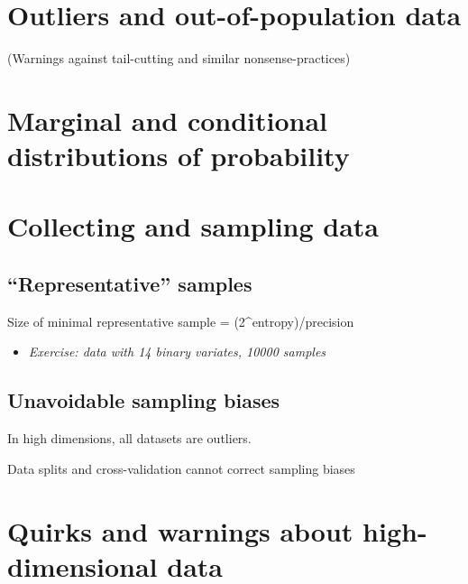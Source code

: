 \documentclass[
  letterpaper,
  DIV=11,
  numbers=noendperiod,
  oneside]{scrreprt}
\providecommand{\tightlist}{%
  \setlength{\itemsep}{0pt}\setlength{\parskip}{0pt}}\usepackage{longtable,booktabs,array}
\begin{document}
\hypertarget{outliers-and-out-of-population-data}{%
\section{Outliers and out-of-population
data}\label{outliers-and-out-of-population-data}}

(Warnings against tail-cutting and similar nonsense-practices)

\hypertarget{marginal-and-conditional-distributions-of-probability}{%
\section{Marginal and conditional distributions of
probability}\label{marginal-and-conditional-distributions-of-probability}}

\hypertarget{collecting-and-sampling-data}{%
\section{Collecting and sampling
data}\label{collecting-and-sampling-data}}

\hypertarget{representative-samples}{%
\subsection{``Representative'' samples}\label{representative-samples}}

Size of minimal representative sample = (2\^{}entropy)/precision

\begin{itemize}
\tightlist
\item
  \emph{Exercise: data with 14 binary variates, 10000 samples}
\end{itemize}

\hypertarget{unavoidable-sampling-biases}{%
\subsection{Unavoidable sampling
biases}\label{unavoidable-sampling-biases}}

In high dimensions, all datasets are outliers.

Data splits and cross-validation cannot correct sampling biases

\hypertarget{quirks-and-warnings-about-high-dimensional-data}{%
\section{Quirks and warnings about high-dimensional
data}\label{quirks-and-warnings-about-high-dimensional-data}}
\end{document}
